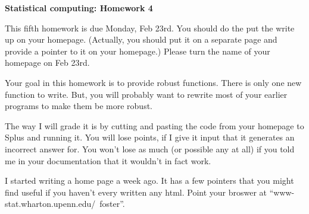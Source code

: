 \renewcommand{\baselinestretch}{1.2}

\centerline{\bf Statistical computing: Homework 4}

\vspace{2ex}

This fifth homework is due Monday, Feb 23rd.  You should do the put
the write up on your homepage.  (Actually, you should put it on a
separate page and provide a pointer to it on your homepage.)  Please
turn the name of your homepage on Feb 23rd.

Your goal in this homework is to provide robust functions.  There is
only one new function to write.  But, you will probably want to
rewrite most of your earlier programs to make them be more robust.

The way I will grade it is by cutting and pasting the code from your
homepage to Splus and running it.  You will lose points, if I give it
input that it generates an incorrect answer for.  You won't lose as
much (or possible any at all) if you told me in your documentation
that it wouldn't in fact work.  

I started writing a home page a week ago.  It has a few pointers that
you might find useful if you haven't every written any html.  Point
your broswer at ``www-stat.wharton.upenn.edu/~foster''.

